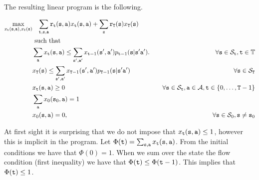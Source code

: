 \begin{leftbar}

The resulting linear program is the following.

\begin{align*}
\max_{x_{\tt t}({\tt s},{\tt a}),x_{{\tt T}}({\tt s})}&\;\;\;
\sum_{{\tt t},{\tt s},{\tt a}}
{\tt r}_{{\tt t}}({\tt s},{\tt a})x_{{\tt t}}({\tt s},{\tt a})+\sum_{{\tt s}}{\tt r}_{{\tt T}}({\tt s})x_{{\tt T}}({\tt s})\\
&\mbox{ such that }\\
&\sum_{{\tt a}} x_{{\tt t}}({\tt s},{\tt a})\leq
\sum_{{\tt s}',{\tt a}'}
x_{{\tt t}-1}({\tt s}',{\tt a}')p_{{\tt t}-1}({\tt s}|{\tt s}'{\tt a}').
 &\quad\forall
{\tt s} \in {\mathcal{S}_{{\tt t}}},
{\tt t}\in\mathbb{T}\\
&x_{{\tt T}}({\tt s})\leq \sum_{{\tt s}',{\tt a}'}
x_{{\tt T}-1}({\tt s}',{\tt a}')p_{{\tt T}-1}({\tt s}|{\tt s}'{\tt a}')
&\quad\forall {\tt s} \in
{\mathcal{S}_{{\tt T}}}\\
&x_{{\tt t}}({\tt s},{\tt a}) \geq 0  &\quad\forall {\tt s} \in
{\mathcal{S}_{{\tt t}}}, {\tt a}\in\mathcal{A},
{\tt t}\in\{0,\ldots,{\tt T}-1\}\\
&\sum_{{\tt a}}x_{0}({\tt s}_0,{\tt a})=1\\
&x_{0}({\tt s},{\tt a})=0,  &\quad\forall {\tt s} \in {\mathcal{S}_{0}},
{\tt s}\neq {\tt s}_0\\
\end{align*}

At first sight it is surprising that we do not impose that
$x_{{\tt t}}({\tt s},{\tt a}) \leq 1 $, however this is implicit in
the program. Let $\Phi({\tt t})= \sum_{{\tt s},{\tt a}}
x_{{\tt t}}({\tt s},{\tt a})$. From the initial conditions we have
that $\Phi(0)=1$. When we sum over the state the flow condition
(first inequality) we have that $\Phi({\tt t})\leq\Phi({\tt t}-1)$.
This implies that $\Phi({\tt t})\leq 1$.


\end{leftbar}
